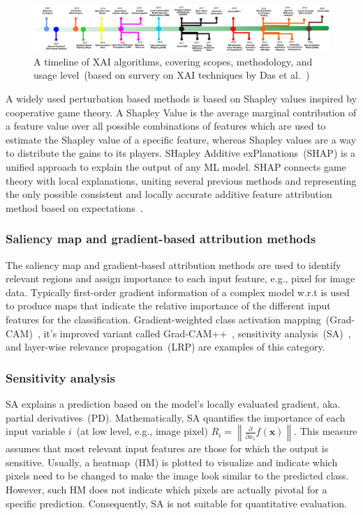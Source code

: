 \begin{figure}
	\centering
	\includegraphics[scale=0.6]{images/xai_roadmap.png}	
    \caption{A timeline of XAI algorithms, covering scopes, methodology, and usage level~(based on survery on XAI techniques by Das et al.~\cite{das2020opportunities})}	
	\label{fig:xai_timeline}
\end{figure}

\hspace*{3.5mm} A widely used perturbation based methods is based on Shapley values inspired by cooperative game theory. A Shapley Value is the average marginal contribution of a feature value over all possible combinations of features which are used to estimate the Shapley value of a specific feature, whereas Shapley values are a way to distribute the gains to its players. SHapley Additive exPlanations~(SHAP) is a unified approach to explain the output of any ML model. SHAP connects game theory with local explanations, uniting several previous methods and representing the only possible consistent and locally accurate additive feature attribution method based on expectations~\cite{NIPS2017_7062}. 

\subsubsection{Saliency map and gradient-based attribution methods}
The saliency map and gradient-based attribution methods are used to identify relevant regions and assign importance to each input feature, e.g., pixel for image data. Typically first-order gradient information of a complex model w.r.t is used to produce maps that indicate the relative importance of the different input features for the classification. Gradient-weighted class activation mapping~(Grad-CAM)~\cite{selvaraju2017grad}, it's improved variant called Grad-CAM++~\cite{chattopadhay2018grad}, sensitivity analysis~(SA)~\cite{baehrens2010explain, simonyan2013deep}, and layer-wise relevance propagation~(LRP) are examples of this category. 

\subsubsection{Sensitivity analysis}
SA explains a prediction based on the model's locally evaluated gradient, aka. partial derivatives~(PD). Mathematically, SA quantifies the importance of each input variable $i$~(at low level, e.g., image pixel) $R_{i}=\left\|\frac{\partial}{\partial x_{i}} f(\mathbf{x})\right\|$. This measure assumes that most relevant input features are those for which the output is sensitive. Usually, a heatmap~(HM) is plotted to visualize and indicate which pixels need to be changed to make the image look similar to the predicted class. However, such HM does not indicate which pixels are actually pivotal for a specific prediction. Consequently, SA is not suitable for quantitative evaluation. 

